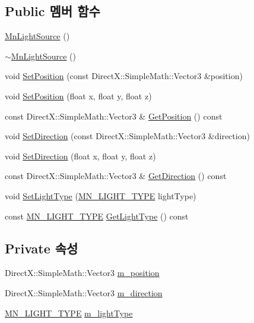 \subsection*{Public 멤버 함수}
\begin{DoxyCompactItemize}
\item 
\hyperlink{class_m_n_l_1_1_mn_light_source_a9d944c7ff20f42dfe68bdfe48cc00c84}{Mn\+Light\+Source} ()
\item 
\hyperlink{class_m_n_l_1_1_mn_light_source_a02e32e5231773e772fec046cb4479d48}{$\sim$\+Mn\+Light\+Source} ()
\item 
void \hyperlink{class_m_n_l_1_1_mn_light_source_aa9b9018b18eb6a8adbe7c3af1686ae9a}{Set\+Position} (const Direct\+X\+::\+Simple\+Math\+::\+Vector3 \&position)
\item 
void \hyperlink{class_m_n_l_1_1_mn_light_source_a258cc6ed072e2528e4f6693aa62c2d55}{Set\+Position} (float x, float y, float z)
\item 
const Direct\+X\+::\+Simple\+Math\+::\+Vector3 \& \hyperlink{class_m_n_l_1_1_mn_light_source_ab521d64dec879256da6707bbc4cdb911}{Get\+Position} () const
\item 
void \hyperlink{class_m_n_l_1_1_mn_light_source_a7f9f5ae434cdbd9e34f6994a019ebd95}{Set\+Direction} (const Direct\+X\+::\+Simple\+Math\+::\+Vector3 \&direction)
\item 
void \hyperlink{class_m_n_l_1_1_mn_light_source_adef28f03e9e49b036cd1b8ead7d05498}{Set\+Direction} (float x, float y, float z)
\item 
const Direct\+X\+::\+Simple\+Math\+::\+Vector3 \& \hyperlink{class_m_n_l_1_1_mn_light_source_aa10c767c46c49d278a003cf50cd826d9}{Get\+Direction} () const
\item 
void \hyperlink{class_m_n_l_1_1_mn_light_source_aa0c2232cc2dfa90774a45fd83df082c8}{Set\+Light\+Type} (\hyperlink{namespace_m_n_l_aac0b78de8bb8c872cb617ede813c113d}{M\+N\+\_\+\+L\+I\+G\+H\+T\+\_\+\+T\+Y\+PE} light\+Type)
\item 
const \hyperlink{namespace_m_n_l_aac0b78de8bb8c872cb617ede813c113d}{M\+N\+\_\+\+L\+I\+G\+H\+T\+\_\+\+T\+Y\+PE} \hyperlink{class_m_n_l_1_1_mn_light_source_a9fb139264ff7303e4f3cdb369e198c7a}{Get\+Light\+Type} () const
\end{DoxyCompactItemize}
\subsection*{Private 속성}
\begin{DoxyCompactItemize}
\item 
Direct\+X\+::\+Simple\+Math\+::\+Vector3 \hyperlink{class_m_n_l_1_1_mn_light_source_ad593da80c4bc4a66399facf65d015edf}{m\+\_\+position}
\item 
Direct\+X\+::\+Simple\+Math\+::\+Vector3 \hyperlink{class_m_n_l_1_1_mn_light_source_aaafaae41b829081e37446b58c923e8bf}{m\+\_\+direction}
\item 
\hyperlink{namespace_m_n_l_aac0b78de8bb8c872cb617ede813c113d}{M\+N\+\_\+\+L\+I\+G\+H\+T\+\_\+\+T\+Y\+PE} \hyperlink{class_m_n_l_1_1_mn_light_source_a5d016d5d35ebaef363819340444b41a3}{m\+\_\+light\+Type}
\end{DoxyCompactItemize}


